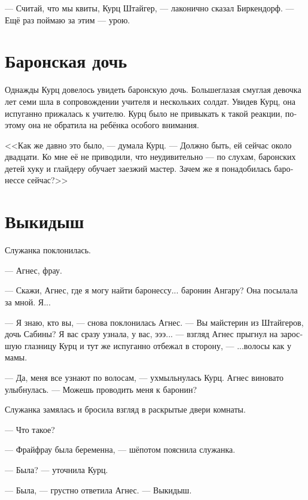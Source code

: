 \documentclass[a4paper,10pt,fleqn]{book}\usepackage{polyglossia}\setdefaultlanguage[babelshorthands=true]{russian}\setotherlanguage{english}\defaultfontfeatures{Ligatures=TeX,Mapping=tex-text}\usepackage{xcolor}\newcommand{\ml}[3]{#2}
\begin{document}
\ml{$0$}
{--- Считай, что мы квиты, Курц Штайгер, --- лаконично сказал Биркендорф.}
{``Call it even, Kurz Steiger,'' Birkendorf succinctly said.}
\ml{$0$}
{--- Ещё раз поймаю за этим --- урою.}
{``If I catch you again, you're done.''}

\section{Баронская дочь}

Однажды Курц довелось увидеть баронскую дочь.
Большеглазая смуглая девочка лет семи шла в сопровождении учителя и нескольких солдат.
Увидев Курц, она испуганно прижалась к учителю.
Курц было не привыкать к такой реакции, поэтому она не обратила на ребёнка особого внимания.

<<Как же давно это было, --- думала Курц.
--- Должно быть, ей сейчас около двадцати.
Ко мне её не приводили, что неудивительно --- по слухам, баронских детей хуку и глайдеру обучает заезжий мастер.
Зачем же я понадобилась баронессе сейчас?>>

\section{Выкидыш}

Служанка поклонилась.

--- Агнес, фрау.

--- Скажи, Агнес, где я могу найти баронессу... баронин Ангару?
Она посылала за мной.
Я...

--- Я знаю, кто вы, --- снова поклонилась Агнес.
\ml{$0$}
{--- Вы майстерин из Штайгеров, дочь Сабины?}
{``You're the \textit{meisterin}, Steiger kin, Sabina's daughter?}
Я вас сразу узнала, у вас, эээ... --- взгляд Агнес прыгнул на заросшую глазницу Курц и тут же испуганно отбежал в сторону, --- ...волосы как у мамы.

--- Да, меня все узнают по волосам, --- ухмыльнулась Курц.
Агнес виновато улыбнулась.
--- Можешь проводить меня к баронин?

Служанка замялась и бросила взгляд в раскрытые двери комнаты.

--- Что такое?

\ml{$0$}
{--- Фрайфрау была беременна, --- шёпотом пояснила служанка.}
{``Freifrau was pregnant,'' the servant quietly explained.}

\ml{$0$}
{--- Была? --- уточнила Курц.}
{``Was?'' Kurz asked.}

--- Была, --- грустно ответила Агнес.
\ml{$0$}
{--- Выкидыш.}
{``She lost the baby.''}
\end{document}

